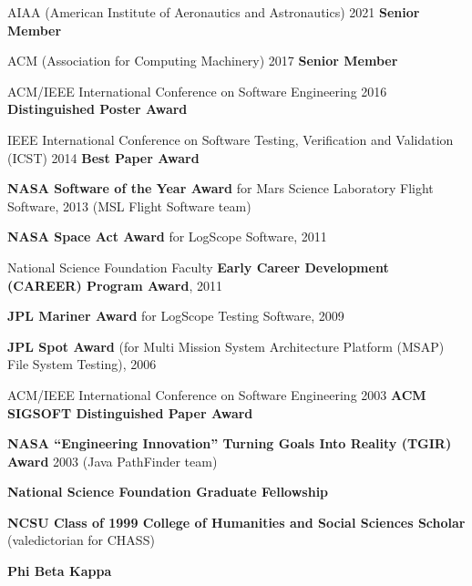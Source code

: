 \documentclass[ComputerScience]{vita}
\begin{document}
\begin{vita}
\begin{Honors}
\item AIAA (American Institute of Aeronautics and Astronautics) 2021 {\bf Senior Member}
\item ACM (Association for Computing Machinery) 2017 {\bf Senior Member}
\item ACM/IEEE International Conference on Software Engineering 2016 {\bf Distinguished Poster Award}
  \item IEEE International Conference on Software Testing, Verification and Validation (ICST) 2014 {\bf Best Paper Award}
  \item {\bf NASA Software of the Year Award} for Mars Science Laboratory Flight Software, 2013 (MSL Flight Software team)
  \item {\bf NASA Space Act Award} for LogScope Software, 2011
  \item National Science Foundation Faculty {\bf Early Career Development (CAREER) Program Award}, 2011
  \item {\bf JPL Mariner Award} for LogScope Testing Software, 2009
  \item {\bf JPL Spot Award} (for Multi Mission System Architecture Platform
  (MSAP) File System Testing), 2006 \item ACM/IEEE International Conference on Software Engineering 2003 {\bf ACM SIGSOFT
  Distinguished Paper Award} \item {\bf NASA ``Engineering Innovation''
  Turning Goals Into Reality (TGIR) Award} 2003 (Java PathFinder team)
  \item {\bf National Science Foundation Graduate Fellowship} \item {\bf NCSU
  Class of 1999 College of Humanities and Social Sciences Scholar}
  (valedictorian for CHASS) \item {\bf Phi Beta Kappa}
\end{Honors}



\end{vita}
\end{document}
